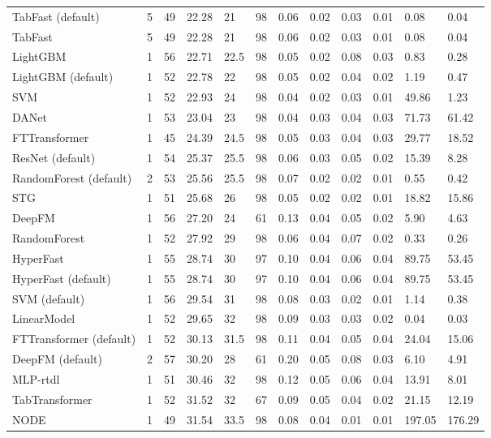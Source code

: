 \begin{tabular}{lllllrllllll}
TabFast (default) & 5 & 49 & 22.28 & 21 & 98 & 0.06 & 0.02 & 0.03 & 0.01 & 0.08 & 0.04 \\
TabFast & 5 & 49 & 22.28 & 21 & 98 & 0.06 & 0.02 & 0.03 & 0.01 & 0.08 & 0.04 \\
LightGBM & 1 & 56 & 22.71 & 22.5 & 98 & 0.05 & 0.02 & 0.08 & 0.03 & 0.83 & 0.28 \\
LightGBM (default) & 1 & 52 & 22.78 & 22 & 98 & 0.05 & 0.02 & 0.04 & 0.02 & 1.19 & 0.47 \\
SVM & 1 & 52 & 22.93 & 24 & 98 & 0.04 & 0.02 & 0.03 & 0.01 & 49.86 & 1.23 \\
DANet & 1 & 53 & 23.04 & 23 & 98 & 0.04 & 0.03 & 0.04 & 0.03 & 71.73 & 61.42 \\
FTTransformer & 1 & 45 & 24.39 & 24.5 & 98 & 0.05 & 0.03 & 0.04 & 0.03 & 29.77 & 18.52 \\
ResNet (default) & 1 & 54 & 25.37 & 25.5 & 98 & 0.06 & 0.03 & 0.05 & 0.02 & 15.39 & 8.28 \\
RandomForest (default) & 2 & 53 & 25.56 & 25.5 & 98 & 0.07 & 0.02 & 0.02 & 0.01 & 0.55 & 0.42 \\
STG & 1 & 51 & 25.68 & 26 & 98 & 0.05 & 0.02 & 0.02 & 0.01 & 18.82 & 15.86 \\
DeepFM & 1 & 56 & 27.20 & 24 & 61 & 0.13 & 0.04 & 0.05 & 0.02 & 5.90 & 4.63 \\
RandomForest & 1 & 52 & 27.92 & 29 & 98 & 0.06 & 0.04 & 0.07 & 0.02 & 0.33 & 0.26 \\
HyperFast & 1 & 55 & 28.74 & 30 & 97 & 0.10 & 0.04 & 0.06 & 0.04 & 89.75 & 53.45 \\
HyperFast (default) & 1 & 55 & 28.74 & 30 & 97 & 0.10 & 0.04 & 0.06 & 0.04 & 89.75 & 53.45 \\
SVM (default) & 1 & 56 & 29.54 & 31 & 98 & 0.08 & 0.03 & 0.02 & 0.01 & 1.14 & 0.38 \\
LinearModel & 1 & 52 & 29.65 & 32 & 98 & 0.09 & 0.03 & 0.03 & 0.02 & 0.04 & 0.03 \\
FTTransformer (default) & 1 & 52 & 30.13 & 31.5 & 98 & 0.11 & 0.04 & 0.05 & 0.04 & 24.04 & 15.06 \\
DeepFM (default) & 2 & 57 & 30.20 & 28 & 61 & 0.20 & 0.05 & 0.08 & 0.03 & 6.10 & 4.91 \\
MLP-rtdl & 1 & 51 & 30.46 & 32 & 98 & 0.12 & 0.05 & 0.06 & 0.04 & 13.91 & 8.01 \\
TabTransformer & 1 & 52 & 31.52 & 32 & 67 & 0.09 & 0.05 & 0.04 & 0.02 & 21.15 & 12.19 \\
NODE & 1 & 49 & 31.54 & 33.5 & 98 & 0.08 & 0.04 & 0.01 & 0.01 & 197.05 & 176.29 \\

\end{tabular}
